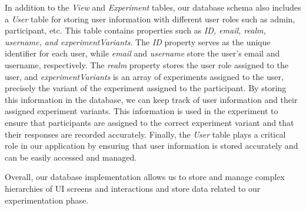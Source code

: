 In addition to the \textit{View} and \textit{Experiment} tables, our database schema also includes a \textit{User} table for storing user information with different user roles such as admin, participant, etc. 
This table contains properties such as \textit{ID, email, realm, username, and experimentVariants}.
The \textit{ID} property serves as the unique identifier for each user, while \textit{email} and \textit{username} store the user's email and username, respectively. 
The \textit{realm} property stores the user role assigned to the user, and \textit{experimentVariants} is an array of experiments assigned to the user, precisely the variant of the experiment assigned to the participant.
By storing this information in the database, we can keep track of user information and their assigned experiment variants. 
This information is used in the experiment to ensure that participants are assigned to the correct experiment variant and that their responses are recorded accurately. 
Finally, the \textit{User} table plays a critical role in our application by ensuring that user information is stored accurately and can be easily accessed and managed.

Overall, our database implementation allows us to store and manage complex hierarchies of UI screens and interactions and store data related to our experimentation phase.